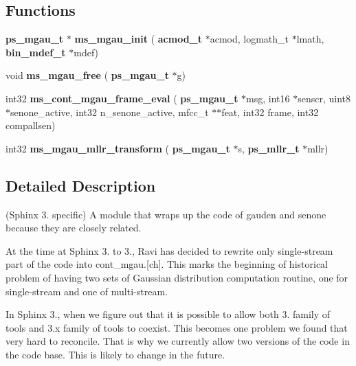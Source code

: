 \subsection*{Functions}
\begin{DoxyCompactItemize}
\item 
\mbox{\label{ms__mgau_8h_a7dbdcb8e1901665b955e324eefdfeea3}} 
\textbf{ ps\+\_\+mgau\+\_\+t} $\ast$ {\bfseries ms\+\_\+mgau\+\_\+init} (\textbf{ acmod\+\_\+t} $\ast$acmod, logmath\+\_\+t $\ast$lmath, \textbf{ bin\+\_\+mdef\+\_\+t} $\ast$mdef)
\item 
\mbox{\label{ms__mgau_8h_ae553fda1fe6082d50cb95b06a85b2be6}} 
void {\bfseries ms\+\_\+mgau\+\_\+free} (\textbf{ ps\+\_\+mgau\+\_\+t} $\ast$g)
\item 
\mbox{\label{ms__mgau_8h_ab1f5637b68fdc1a4d24e4d6275353216}} 
int32 {\bfseries ms\+\_\+cont\+\_\+mgau\+\_\+frame\+\_\+eval} (\textbf{ ps\+\_\+mgau\+\_\+t} $\ast$msg, int16 $\ast$senscr, uint8 $\ast$senone\+\_\+active, int32 n\+\_\+senone\+\_\+active, mfcc\+\_\+t $\ast$$\ast$feat, int32 frame, int32 compallsen)
\item 
\mbox{\label{ms__mgau_8h_ad3fe464ff15e735bfef15e628c5433fc}} 
int32 {\bfseries ms\+\_\+mgau\+\_\+mllr\+\_\+transform} (\textbf{ ps\+\_\+mgau\+\_\+t} $\ast$s, \textbf{ ps\+\_\+mllr\+\_\+t} $\ast$mllr)
\end{DoxyCompactItemize}


\subsection{Detailed Description}
(Sphinx 3. specific) A module that wraps up the code of gauden and senone because they are closely related. 

At the time at Sphinx 3. to 3., Ravi has decided to rewrite only single-\/stream part of the code into cont\+\_\+mgau.[ch]. This marks the beginning of historical problem of having two sets of Gaussian distribution computation routine, one for single-\/stream and one of multi-\/stream.

In Sphinx 3., when we figure out that it is possible to allow both 3. family of tools and 3.\+x family of tools to coexist. This becomes one problem we found that very hard to reconcile. That is why we currently allow two versions of the code in the code base. This is likely to change in the future. 